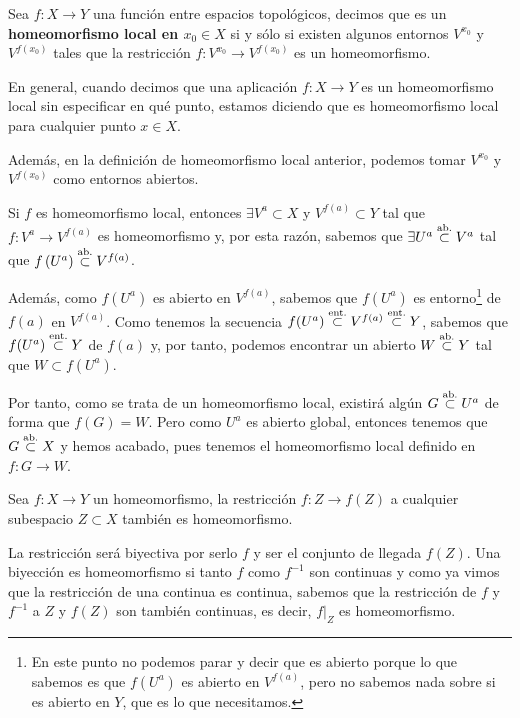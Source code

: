 \begin{defi}
Sea $f: X \rightarrow Y$ una función entre espacios topológicos, decimos que es un \textbf{homeomorfismo local en $x_0 \in X$} si y sólo si existen algunos entornos $V^{x_0}$ y $V^{f\left( x_0 \right)}$ tales que la restricción $f: V^{x_0} \rightarrow V^{f\left( x_0 \right)}$ es un homeomorfismo.
\end{defi}

\begin{obs}
En general, cuando decimos que una aplicación $f:X\rightarrow Y$ es un homeomorfismo local sin especificar en qué punto, estamos diciendo que es homeomorfismo local para cualquier punto $x\in X$.

Además, en la definición de homeomorfismo local anterior, podemos tomar $V^{x_0}$ y $V^{f\left( x_0 \right)}$ como entornos abiertos.
\begin{demo}
Si $f$ es homeomorfismo local, entonces $\exists V^a \subset X$ y $V^{f\left( a \right)} \subset Y$ tal que $f: V^a \rightarrow V^{f\left( a \right)}$ es homeomorfismo y, por esta razón, sabemos que $\exists U^a \stackrel{\text{ab.}}{\subset} V^a$ tal que $f\left( U^a \right) \stackrel{\text{ab.}}{\subset} V^{f\left( a \right)}$. 

Además, como $f(U^a)$ es abierto en $V^{f\left( a \right)}$, sabemos que $f(U^a)$ es entorno\footnote{En este punto no podemos parar y decir que es abierto porque lo que sabemos es que $f(U^a)$ es abierto en $V^{f(a)}$, pero no sabemos nada sobre si es abierto en $Y$, que es lo que necesitamos.} de $f(a)$ en $V^{f(a)}$. Como tenemos la secuencia $f(U^a) \stackrel{\text{ent.}}{\subset} V^{f(a)} \stackrel{\text{ent.}}{\subset} Y$, sabemos que $f(U^a) \stackrel{\text{ent.}}{\subset} Y$ de $f(a)$ y, por tanto, podemos encontrar un abierto $W \stackrel{\text{ab.}}{\subset} Y$ tal que $W\subset f(U^a)$.

Por tanto, como se trata de un homeomorfismo local, existirá algún $G \stackrel{\text{ab.}}{\subset} U^a$ de forma que $f(G) = W$. Pero como $U^a$ es abierto global, entonces tenemos que $G\stackrel{\text{ab.}}{\subset} X$ y hemos acabado, pues tenemos el homeomorfismo local definido en $f: G \rightarrow W$.
\end{demo}
\end{obs}

\begin{prop}
Sea $f: X \rightarrow Y$ un homeomorfismo, la restricción $f: Z \rightarrow f\left( Z \right)$ a cualquier subespacio $Z \subset X$ también es homeomorfismo.
\end{prop}
\begin{demo}
La restricción será biyectiva por serlo $f$ y ser el conjunto de llegada $f(Z)$. Una biyección es homeomorfismo si tanto $f$ como $f^{-1}$ son continuas y como ya vimos que la restricción de una continua es continua, sabemos que la restricción de $f$ y $f^{-1}$ a $Z$ y $f\left( Z \right)$ son también continuas, es decir, $f|_Z$ es homeomorfismo.
\end{demo}

